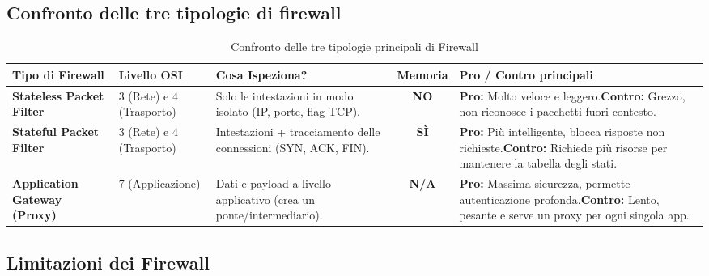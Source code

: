 \documentclass[a4paper,12pt]{report}
\renewcommand{\arraystretch}{1.2} %
\begin{document}
\subsection{Confronto delle tre tipologie di firewall}
\begin{table}[hbt!]
\centering
\renewcommand{\arraystretch}{1.5} %
\begin{tabular}{|p{3cm}|p{2cm}|p{3.5cm}|c|p{4cm}|}
\hline
\textbf{Tipo di Firewall} & \textbf{Livello OSI} & \textbf{Cosa Ispeziona?} & \textbf{Memoria} & \textbf{Pro / Contro principali} \\ \hline
\textbf{Stateless Packet Filter} & 3 (Rete) e 4 (Trasporto) & Solo le intestazioni in modo isolato (IP, porte, flag TCP). & \textbf{NO} & \textbf{Pro:} Molto veloce e leggero.\newline \textbf{Contro:} Grezzo, non riconosce i pacchetti fuori contesto. \\ \hline
\textbf{Stateful Packet Filter} & 3 (Rete) e 4 (Trasporto) & Intestazioni + tracciamento delle connessioni (SYN, ACK, FIN). & \textbf{SÌ} & \textbf{Pro:} Più intelligente, blocca risposte non richieste.\newline \textbf{Contro:} Richiede più risorse per mantenere la tabella degli stati. \\ \hline
\textbf{Application Gateway (Proxy)} & 7 (Applicazione) & Dati e payload a livello applicativo (crea un ponte/intermediario). & \textbf{N/A} & \textbf{Pro:} Massima sicurezza, permette autenticazione profonda.\newline \textbf{Contro:} Lento, pesante e serve un proxy per ogni singola app. \\ \hline
\end{tabular}
\caption{Confronto delle tre tipologie principali di Firewall}
\label{tab:confronto_firewall}
\end{table}
\subsection{Limitazioni dei Firewall}
\end{document}
